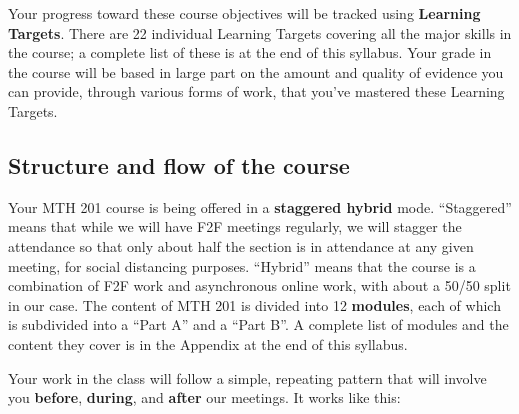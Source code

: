 \documentclass[]{article}
\begin{document}
Your progress toward these course objectives will be tracked using
\textbf{Learning Targets}. There are 22 individual Learning Targets
covering all the major skills in the course; a complete list of these is
at the end of this syllabus. Your grade in the course will be based in
large part on the amount and quality of evidence you can provide,
through various forms of work, that you've mastered these Learning
Targets.

\hypertarget{structure-and-flow-of-the-course}{%
\subsection{Structure and flow of the
course}\label{structure-and-flow-of-the-course}}

Your MTH 201 course is being offered in a \textbf{staggered hybrid}
mode. ``Staggered'' means that while we will have F2F meetings
regularly, we will stagger the attendance so that only about half the
section is in attendance at any given meeting, for social distancing
purposes. ``Hybrid'' means that the course is a combination of F2F work
and asynchronous online work, with about a 50/50 split in our case. The
content of MTH 201 is divided into 12 \textbf{modules}, each of which is
subdivided into a ``Part A'' and a ``Part B''. A complete list of
modules and the content they cover is in the Appendix at the end of this
syllabus.

Your work in the class will follow a simple, repeating pattern that will
involve you \textbf{before}, \textbf{during}, and \textbf{after} our
meetings. It works like this:
\end{document}
